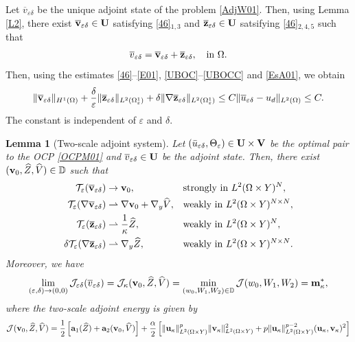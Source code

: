 \documentclass[11pt,a4paper]{article}
\numberwithin{equation}{section}
\def\wo{\overline}
\def\O{\Omega}
\def\d{\delta}
\def\e{\varepsilon}
\def\Te{{\cal T}_\varepsilon}
\def\a{{\alpha}}
\def\Ga{{\bf a}}
\def\D{{\mathbb{D}}}
\def\Pc{{\mathcal{P}}}
\def\Pc{{\mathcal{P}}}
\def\Jc{{\mathcal{J}}}
\def\ed{{\varepsilon\delta}}
\def\wh{\widehat }
\def\X{\times }
\def\Ga{{\bf a}}
\def\Gm{{\bf m}}
\def\Gu{{\bf u}}
\def\Gv{{\bf v}}
\def\Gz{{\bf z}}
\def\GU{{\bf U}}
\def\GV{{\bf V}}
\newtheorem{lemma}[theorem]{Lemma}
\begin{document}
	Let $\wo v_\ed$ be the unique adjoint state of the problem \eqref{AdjW01}. Then, using Lemma \ref{L2}, there exist $\wo\Gv_\ed\in \GU$ satisfying  \eqref{46}$_{1,3}$ and $\wo\Gz_\ed\in \GU$ satsifying \eqref{46}$_{2,4,5}$ such that
	$$\wo v_\ed=\wo\Gv_\ed+\wo\Gz_\ed,\quad \text{in $\O$}.$$
	 Then, using the estimates \eqref{46}--\eqref{E01}, \eqref{UBOC}--\eqref{UBOCC} and \eqref{EsA01}, we obtain
	\begin{equation}\label{61}
		\|\wo \Gv_\ed\|_{H^1(\O)}+{\d\over \e}\|\wo\Gz_\ed\|_{L^2(\O^1_\e)}+\d\|\nabla\wo\Gz_\ed\|_{L^2(\O^1_\e)}\leq C\|\wo u_\ed-u_d\|_{L^2(\O)}\leq C.
	\end{equation}
	The constant is independent of $\e$ and $\d$.
	\begin{lemma}[Two-scale adjoint system]\label{L08}
		Let $(\bar{u}_\ed,\Theta_\e)\in\GU\X \GV$ be the optimal pair to the OCP \eqref{OCPM01} and $\wo v_\ed\in\GU$ be the adjoint state. Then, there exist $(\Gv_0,\wh Z,\wh V)\in\D$ such that
		\begin{equation}\label{Con011}
			\begin{aligned}
				\Te(\wo\Gv_\ed)&\to \Gv_0, &&\text{strongly in $L^2(\O\X Y)^N$},\\
				\Te(\nabla \wo\Gv_\ed) &\rightharpoonup \nabla \Gv_0+\nabla_y\wh V, &&\text{weakly in $L^2(\O\X Y)^{N\X N}$},\\
				 \Te(\wo\Gz_\ed) &\rightharpoonup{1\over \kappa}\wh Z,&& \text{weakly in $L^2(\O\X Y)^N$},\\
				 \d\Te(\nabla \wo\Gz_\ed) &\rightharpoonup \nabla_y\wh Z,&&\text{weakly in $L^2(\O\X Y)^{N\X N}$}.
			\end{aligned}
		\end{equation}
		Moreover, we have
		\begin{equation}\label{ECA01}
			\lim_{(\e,\d)\to(0,0)}\Jc_\ed(\wo v_\ed)=\Jc_\kappa(\Gv_0,\wh Z,\wh V)=\min_{(w_0, W_1,W_2)\in\D}\Jc(w_0,W_1,W_2)=\Gm^\ast_\kappa,
		\end{equation}
		where the two-scale adjoint energy is given by
		\begin{multline*}
			\Jc(\Gv_0,\wh Z,\wh V)={1\over 2}\left[\Ga_1(\wh Z)+\Ga_2(\Gv_0,\wh V)\right]+{\a\over 2}\left[\|\Gu_\kappa\|^p_{L^2(\O\X Y)}\|\Gv_\kappa\|^2_{L^2(\O\X Y)}+p\|\Gu_\kappa\|^{p-2}_{L^2(\O\X Y)}(\Gu_\kappa,\Gv_\kappa)^2\right]\\

\end{multline*}
\end{lemma}
\end{document}
